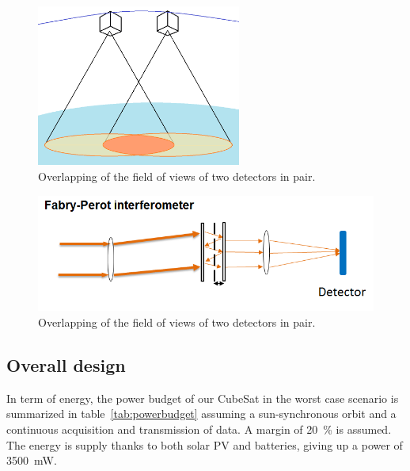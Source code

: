 \documentclass{scrartcl}
\begin{document}
\begin{figure}[hbpt]
\centering
\includegraphics[width=0.6\textwidth]{img/eng_fig_1}
\caption{Overlapping of the field of views of two detectors in pair.}
\label{fig:eng_fig_1}
\end{figure}

\begin{figure}[hbpt]
\centering
\includegraphics[width=\textwidth]{img/eng_fig_2}
\caption{Overlapping of the field of views of two detectors in pair.}
\label{fig:eng_fig_2}
\end{figure}

\subsection{Overall design}
\label{sec:overalldesign}

In term of energy, the power budget of our CubeSat in the worst case scenario is
summarized in table~\ref{tab:powerbudget} assuming a sun-synchronous orbit and a
continuous acquisition and transmission of data. A margin of 20~\% is assumed.
The energy is supply thanks to both solar PV and batteries, giving up a power of
\SI{3500}{mW}.
\end{document}

